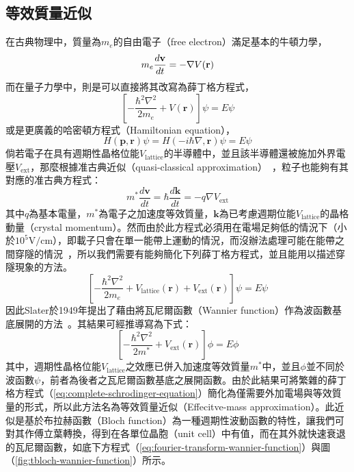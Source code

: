 \subsection{等效質量近似}\label{cs:EMA}
在古典物理中，質量為$m_e$的自由電子（free electron）滿足基本的牛頓力學，
\begin{equation}
m_e\frac{d\mathbf{v}}{dt}=-\nabla V(\mathbf{r})\\[5pt]
\end{equation}
而在量子力學中，則是可以直接將其改寫為薛丁格方程式，
\begin{equation}
\left[-\frac{\hbar^2\nabla^2}{2m_e}+V(\mathbf{r})\right]\psi=E\psi
\end{equation}
或是更廣義的哈密頓方程式（Hamiltonian equation），
\begin{equation}
H(\mathbf{p},\mathbf{r})\psi=H(-i\hbar\nabla,\mathbf{r})\psi=E\psi
\end{equation}
倘若電子在具有週期性晶格位能$V_\text{lattice}$的半導體中，並且該半導體還被施加外界電壓$V_\text{ext}$，那麼根據准古典近似（quasi-classical approximation）~\cite{smith1963wavech5}，粒子也能夠有其對應的准古典方程式：
\begin{equation}
m^*\frac{d\mathbf{v}}{dt}=\hbar\frac{d\mathbf{k}}{dt}=-q\nabla V_\text{ext}
\end{equation}
其中$q$為基本電量，$m^*$為電子之加速度等效質量，$\mathbf{k}$為已考慮週期位能$V_\text{lattice}$的晶格動量（crystal momentum）。然而由於此方程式必須用在電場足夠低的情況下（小於$10^5\left.\mathrm{V}/\mathrm{cm}\right.$），即載子只會在單一能帶上運動的情況，而沒辦法處理可能在能帶之間穿隧的情況~\cite{smith1963wavech5}\cite{bloch1934z}，所以我們需要有能夠簡化下列薛丁格方程式，並且能用以描述穿隧現象的方法。
\begin{equation}
\label{eq:complete-schrodinger-equation}
\left[-\frac{\hbar^2\nabla^2}{2m_e}+V_\text{lattice}(\mathbf{r})+V_\text{ext}(\mathbf{r})\right]\psi=E\psi
\end{equation}
\hspace{2em}因此Slater於1949年提出了藉由將瓦尼爾函數（Wannier function）作為波函數基底展開的方法~\cite{slater1949electrons}\cite{smith1963wavech11}。其結果可經推導寫為下式：
\begin{equation}
\label{eq:effective-mass-approximation-final-form}
\left[-\frac{\hbar^2\nabla^2}{2m^*}+V_\text{ext}(\mathbf{r})\right]\phi=E\phi
\end{equation}
其中，週期性晶格位能$V_\text{lattice}$之效應已併入加速度等效質量$m^*$中，並且$\phi$並不同於波函數$\psi$，前者為後者之瓦尼爾函數基底之展開函數。由於此結果可將繁雜的薛丁格方程式（\ref{eq:complete-schrodinger-equation}）簡化為僅需要外加電場與等效質量的形式，所以此方法名為等效質量近似（Effecitve-mass approximation）。此近似是基於布拉赫函數（Bloch function）為一種週期性波動函數的特性，讓我們可對其作傅立葉轉換，得到在各單位晶胞（unit cell）中有值，而在其外就快速衰退的瓦尼爾函數，如底下方程式（\ref{eq:fourier-transform-wannier-function}）與圖（\ref{fig:tbloch-wannier-function}）所示。
